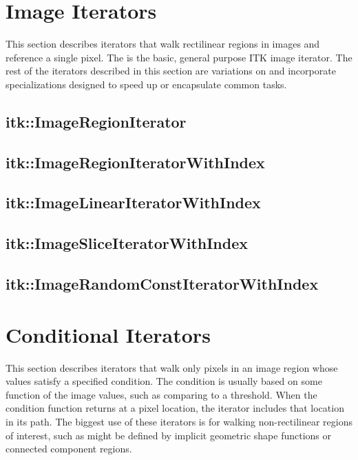 



\section{Image Iterators}
\label{sec:ImageIterators}
This section describes iterators that walk rectilinear regions in images and
reference a single pixel.  The  is the basic,
general purpose ITK image iterator.  The rest of the
iterators described in this section are variations on
 and incorporate specializations designed to 
speed up or encapsulate common tasks.


\subsection{itk::ImageRegionIterator}
\label{sec:itkImageRegionIterator}


\subsection{itk::ImageRegionIteratorWithIndex}
\label{sec:itkImageRegionIteratorWithIndex}


\subsection{itk::ImageLinearIteratorWithIndex}
\label{sec:itkImageLinearIteratorWithIndex}


\subsection{itk::ImageSliceIteratorWithIndex}
\label{sec:itkImageSliceIteratorWithIndex}


\subsection{itk::ImageRandomConstIteratorWithIndex}
\label{sec:itkImageRandomConstIteratorWithIndex}



\section{Conditional Iterators}
\label{sec:ConditionalIterators}
This section describes iterators that walk only pixels in an image region whose
values satisfy a specified condition.  The condition is usually based on some
function of the image values, such as comparing to a threshold.  When the
condition function returns  at a pixel location, the iterator
includes that location in its path.  The biggest use of these iterators is for
walking non-rectilinear regions of interest, such as might be defined by
implicit geometric shape functions or connected component regions.

